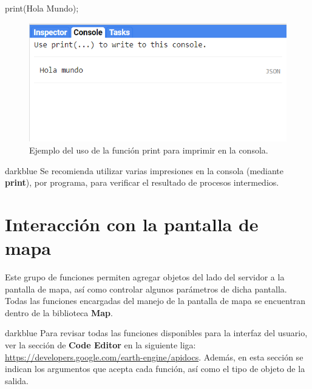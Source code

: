 \documentclass[
  12pt,
  letterpaper,
  twoside]{book}
\newenvironment{Shaded}{\begin{snugshade}}{\end{snugshade}}
\newcommand{\FunctionTok}[1]{\textcolor[rgb]{0.48,0.12,0.64}{#1}}
\newcommand{\NormalTok}[1]{#1}
\newcommand{\OperatorTok}[1]{\textcolor[rgb]{0.00,0.00,0.00}{#1}}
\newcommand{\StringTok}[1]{\textcolor[rgb]{0.87,0.29,0.22}{#1}}
\newcommand\boldpurple[1]{\textcolor{darkpurple}{\textbf{#1}}}
\begin{document}
\begin{Shaded}
\begin{Highlighting}[]
\FunctionTok{print}\NormalTok{(}\StringTok{\textquotesingle{}Hola Mundo\textquotesingle{}}\NormalTok{)}\OperatorTok{;}
\end{Highlighting}
\end{Shaded}

\begin{figure}[H]

{\centering \includegraphics[width=0.8\linewidth]{Img/holaMundo} 

}

\caption{Ejemplo del uso de la función print para imprimir en la consola.}\label{fig:f31}
\end{figure}

\begin{bluebox2}

\begin{awesomeblock}{5pt}{\faLightbulb}{darkblue}
Se recomienda utilizar varias impresiones en la consola (mediante \boldpurple{print}), por programa, para verificar el resultado de procesos intermedios.

\end{awesomeblock}

\end{bluebox2}

\hypertarget{interacciuxf3n-con-la-pantalla-de-mapa}{%
\section{Interacción con la pantalla de mapa}\label{interacciuxf3n-con-la-pantalla-de-mapa}}

Este grupo de funciones permiten agregar objetos del lado del servidor a la pantalla de mapa, así como controlar algunos parámetros de dicha pantalla. Todas las funciones encargadas del manejo de la pantalla de mapa se encuentran dentro de la biblioteca \boldpurple{Map}.

\begin{bluebox2}

\begin{awesomeblock}{5pt}{\faLightbulb}{darkblue}
Para revisar todas las funciones disponibles para la interfaz del usuario, ver la sección de \textbf{Code Editor} en la siguiente liga: \url{https://developers.google.com/earth-engine/apidocs}. Además, en esta sección se indican los argumentos que acepta cada función, así como el tipo de objeto de la salida.

\end{awesomeblock}

\end{bluebox2}
\end{document}
